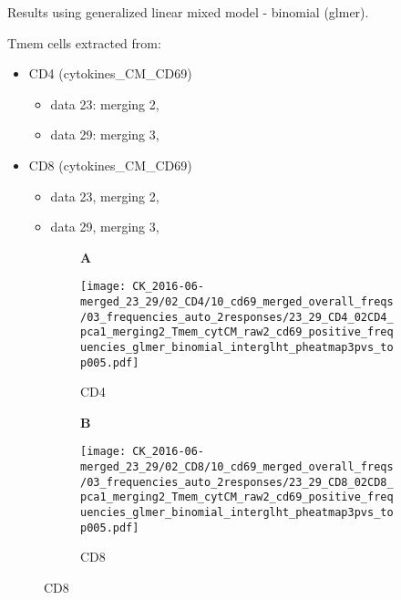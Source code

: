\documentclass[a4paper, 12pt]{article}
\begin{document}
\pagestyle{empty}


Results using generalized linear mixed model - binomial (glmer).

Tmem cells extracted from:
\begin{itemize}
  \item  CD4 (cytokines\_CM\_CD69)
      \begin{itemize}
      \item data 23: merging 2, 
      \item data 29: merging 3,
    \end{itemize}

  \item  CD8 (cytokines\_CM\_CD69)
  \begin{itemize}
  \item data 23, merging 2,
  \item data 29, merging 3, 
\end{itemize}
  
\end{itemize}


\begin{figure}[!thb]
\centering

    \begin{subfigure}[t]{0.02\textwidth}
    \vskip 0pt
        \textbf{\textsf{\normalsize A}}
    \end{subfigure}
    \begin{subfigure}[t]{0.45\textwidth}
    \vskip 0pt
    \caption{CD4}
        \texttt{[image: CK\_2016-06-merged\_23\_29/02\_CD4/10\_cd69\_merged\_overall\_freqs/03\_frequencies\_auto\_2responses/23\_29\_CD4\_02CD4\_pca1\_merging2\_Tmem\_cytCM\_raw2\_cd69\_positive\_frequencies\_glmer\_binomial\_interglht\_pheatmap3pvs\_top005.pdf]}
    \end{subfigure}
\quad
    \begin{subfigure}[t]{0.02\textwidth}
    \vskip 0pt
        \textbf{\textsf{\normalsize B}}
    \end{subfigure}
    \begin{subfigure}[t]{0.45\textwidth}
    \vskip 0pt
    \caption{CD8}
        \texttt{[image: CK\_2016-06-merged\_23\_29/02\_CD8/10\_cd69\_merged\_overall\_freqs/03\_frequencies\_auto\_2responses/23\_29\_CD8\_02CD8\_pca1\_merging2\_Tmem\_cytCM\_raw2\_cd69\_positive\_frequencies\_glmer\_binomial\_interglht\_pheatmap3pvs\_top005.pdf]}
    \end{subfigure}
    
    
\end{figure}
\end{document}
